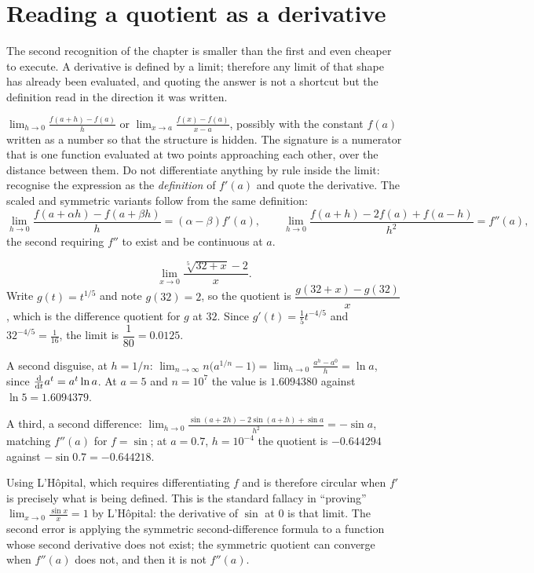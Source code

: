 \section{Reading a quotient as a derivative}

The second recognition of the chapter is smaller than the first and even cheaper to execute. A derivative is defined by a limit; therefore any limit of that shape has already been evaluated, and quoting the answer is not a shortcut but the definition read in the direction it was written.

\cue $\displaystyle\lim_{h\to0}\frac{f(a+h)-f(a)}{h}$ or $\displaystyle\lim_{x\to a}\frac{f(x)-f(a)}{x-a}$, possibly with the constant $f(a)$ written as a number so that the structure is hidden. The signature is a numerator that is one function evaluated at two points approaching each other, over the distance between them.
\method Do not differentiate anything by rule inside the limit: recognise the expression as the \emph{definition} of $f'(a)$ and quote the derivative. The scaled and symmetric variants follow from the same definition:
\[\lim_{h\to0}\frac{f(a+\alpha h)-f(a+\beta h)}{h}=(\alpha-\beta)f'(a),\qquad \lim_{h\to0}\frac{f(a+h)-2f(a)+f(a-h)}{h^{2}}=f''(a),\]
the second requiring $f''$ to exist and be continuous at $a$.

\begin{worked}
\[\lim_{x\to0}\frac{\sqrt[5]{32+x}-2}{x}.\]
Write $g(t)=t^{1/5}$ and note $g(32)=2$, so the quotient is $\dfrac{g(32+x)-g(32)}{x}$, which is the difference quotient for $g$ at $32$. Since $g'(t)=\tfrac15t^{-4/5}$ and $32^{-4/5}=\tfrac{1}{16}$, the limit is $\dfrac{1}{80}=0.0125$.

A second disguise, at $h=1/n$: $\displaystyle\lim_{n\to\infty}n\bigl(a^{1/n}-1\bigr)=\lim_{h\to0}\frac{a^{h}-a^{0}}{h}=\ln a$, since $\frac{\mathrm{d}}{\mathrm{d}t}a^{t}=a^{t}\ln a$. At $a=5$ and $n=10^{7}$ the value is $1.6094380$ against $\ln5=1.6094379$.

A third, a second difference: $\displaystyle\lim_{h\to0}\frac{\sin(a+2h)-2\sin(a+h)+\sin a}{h^{2}}=-\sin a$, matching $f''(a)$ for $f=\sin$; at $a=0.7$, $h=10^{-4}$ the quotient is $-0.644294$ against $-\sin0.7=-0.644218$.
\end{worked}

\begin{trap}
Using L'H\^opital, which requires differentiating $f$ and is therefore circular when $f'$ is precisely what is being defined. This is the standard fallacy in ``proving'' $\displaystyle\lim_{x\to0}\tfrac{\sin x}{x}=1$ by L'H\^opital: the derivative of $\sin$ at $0$ is that limit. The second error is applying the symmetric second-difference formula to a function whose second derivative does not exist; the symmetric quotient can converge when $f''(a)$ does not, and then it is not $f''(a)$.
\end{trap}

